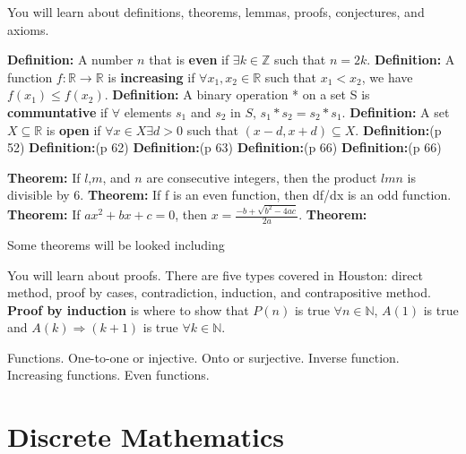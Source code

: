 \documentclass[openany,10pt]{book}
\begin{document}
You will learn about definitions, theorems, lemmas, proofs, conjectures, and axioms.

\noindent \textbf{Definition:} A number $n$ that is \textbf{even} if $\exists k\in\mathbb{Z}$ such that  $n = 2k$. \newline
\noindent \textbf{Definition:} A function $f:\mathbb{R}\rightarrow\mathbb{R}$ is \textbf{increasing} if $\forall x_1, x_2\in\mathbb{R}$ such that $x_1<x_2$, we have $f(x_1)\leq f(x_2)$.\newline
\noindent \textbf{Definition:} A binary operation * on a set S is \textbf{communtative} if $\forall$ elements $s_1$ and $s_2$ in $S$, $s_1*s_2=s_2*s_1$.\newline
\noindent \textbf{Definition:} A set $X\subseteq \mathbb{R}$ is \textbf{open} if $\forall x\in X \exists d>0$ such that $(x-d,x+d) \subseteq X$.\newline
\noindent \textbf{Definition:}(p 52)\newline
\noindent \textbf{Definition:}(p 62)\newline
\noindent \textbf{Definition:}(p 63)\newline
\noindent \textbf{Definition:}(p 66)\newline
\noindent \textbf{Definition:}(p 66)

\noindent \textbf{Theorem:} If $l$,$m$, and $n$ are consecutive integers, then the product $lmn$ is divisible by 6.\newline
\noindent \textbf{Theorem:} If f is an even function, then df/dx is an odd function.\newline
\noindent \textbf{Theorem:} If $ax^2 +bx+c=0$, then $x=\frac{-b+\sqrt{b^2-4ac}}{2a}$.\newline
\noindent \textbf{Theorem:}\newline

Some theorems will be looked including 

You will learn about proofs.  There are five types covered in Houston: direct method, proof by cases, contradiction, induction, and contrapositive method.  \textbf{Proof by induction} is where to show that $P(n)$ is true $\forall n\in \mathbb{N}$, $A(1)$ is true and $A(k)\Rightarrow(k+1)$ is true $\forall k \in \mathbb{N}$.

Functions.  One-to-one or injective.  Onto or surjective.  Inverse function.  Increasing functions.  Even functions. 


\chapter{Discrete Mathematics}
\end{document}
